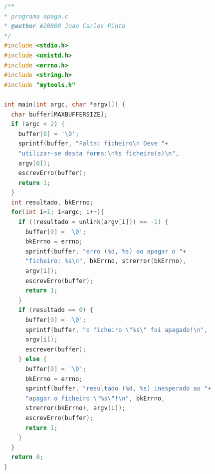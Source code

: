 \begin{lstlisting}[language={c},
	caption={Código do programa: \textbf{apaga}.},
label=lst:p1e]
/**
* programa apaga.c
* @author #20808 Joao Carlos Pinto
*/
#include <stdio.h>
#include <unistd.h>
#include <errno.h>
#include <string.h>
#include "mytools.h"

int main(int argc, char *argv[]) {
  char buffer[MAXBUFFERSIZE];
  if (argc < 2) {
    buffer[0] = '\0';
    sprintf(buffer, "Falta: ficheiro\n Deve "+
    "utilizar-se desta forma:\n%s ficheiro(s)\n", 
    argv[0]);
    escrevErro(buffer);
    return 1;
  }
  int resultado, bkErrno;
  for(int i=1; i<argc; i++){
    if ((resultado = unlink(argv[i])) == -1) {
      buffer[0] = '\0';
      bkErrno = errno;
      sprintf(buffer, "erro (%d, %s) ao apagar o "+
      "ficheiro: %s\n", bkErrno, strerror(bkErrno), 
      argv[i]);
      escrevErro(buffer);
      return 1;
    }
    if (resultado == 0) {
      buffer[0] = '\0';
      sprintf(buffer, "o ficheiro \"%s\" foi apagado!\n", 
      argv[i]);
      escrever(buffer);
    } else {
      buffer[0] = '\0';
      bkErrno = errno;
      sprintf(buffer, "resultado (%d, %s) inesperado ao "+
      "apagar o ficheiro \"%s\"!\n", bkErrno, 
      strerror(bkErrno), argv[i]);
      escrevErro(buffer);
      return 1;
    }
  }
  return 0;
}
\end{lstlisting}


